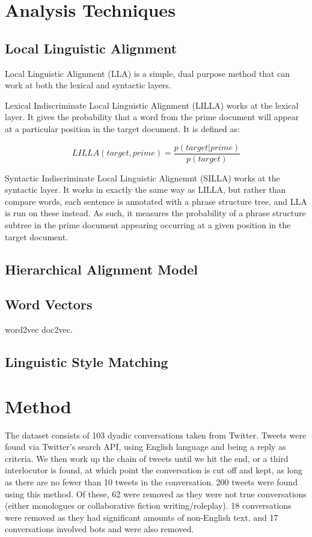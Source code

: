 \documentclass[conference]{IEEEtran}
\begin{document}
{\section{Analysis Techniques}

\subsection{Local Linguistic Alignment}
Local Linguistic Alignment (LLA) is a simple,  dual purpose method that can work at both the lexical
and syntactic layers\cite{wang2014linguistic, xu2015evaluation}.

Lexical Indiscriminate Local Linguistic Alignment (LILLA) works at the lexical layer. It gives the
probability that a word from the prime document will appear at a particular position in the target 
document. It is defined as:

\[LILLA(target, prime) = \frac{p(target|prime)}{p(target)}\]

Syntactic Indiscriminate Local Linguistic Alignemnt (SILLA) works at the syntactic layer. It works
in exactly the same way as LILLA, but rather than compare words, each sentence is annotated with a
phrase structure tree, and LLA is run on these instead. As such, it measures the probability of a
phrase structure subtree in the prime document appearing occurring at a given position in the target
document. 


\subsection{Hierarchical Alignment Model}
\cite{doyle2016robust}

\subsection{Word Vectors}
word2vec\cite{mikolov2013distributed}
doc2vec\cite{le2014distributed}.

\subsection{Linguistic Style Matching}
\cite{niederhoffer2002linguistic}


\section{Method}
The dataset consists of 103 dyadic conversations taken from Twitter. Tweets were found via Twitter's 
search API, using English language and being a reply as criteria. We then work up the chain of tweets 
until we hit the end, or a third interlocutor is found, at which point the conversation is cut off and 
kept, as long as there are no fewer than 10 tweets in the conversation. 200 tweets were found using 
this method. Of these, 62 were removed as they were not true conversations (either monologues or 
collaborative fiction writing/roleplay). 18 conversations were removed as they had significant amounts 
of non-English text, and 17 conversations involved bots and were also removed.

}
\end{document}
